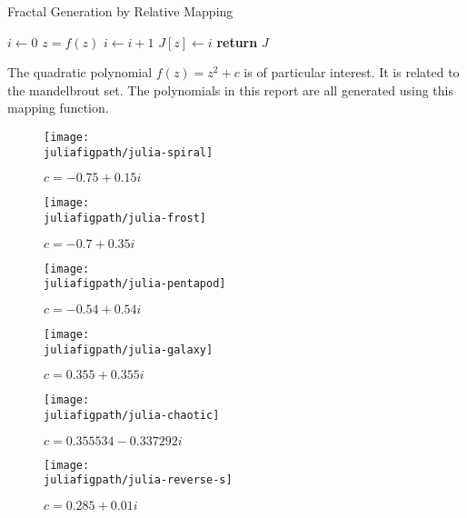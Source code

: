 \documentclass[12pt,a4paper]{article}
\newcommand{\juliafigpath}{../fig/julia}
\begin{document}
    \begin{algorithm}
        \caption{Fractal Generation by Relative Mapping}
        \label{alg:julia}
        \begin{algorithmic}[1]
                    \State $i \gets 0$
                        \State $z = f(z)$
                        \State $i \gets i + 1$
                    \EndWhile
                    \State $J[z] \gets i$
                \EndFor
                \State \textbf{return} $J$
            \EndFunction
        \end{algorithmic}
    \end{algorithm}
    The quadratic polynomial $f(z) = z^2 + c$ is of particular interest. It is related to the mandelbrout set.
    The polynomials in this report are all generated using this mapping function.
    \begin{figure}
        \centering
    \end{figure}
    \begin{figure}
        \centering
        \texttt{[image: \\juliafigpath/julia-spiral]}
        \caption{$c = -0.75 + 0.15i$}
    \end{figure}
    \newpage
    \thispagestyle{empty}
    \begin{figure}
        \centering
        \texttt{[image: \\juliafigpath/julia-frost]}
        \caption{$c = -0.7 + 0.35i$}
        \texttt{[image: \\juliafigpath/julia-pentapod]}
        \caption{$c = -0.54 + 0.54i$}
    \end{figure}
    \begin{figure}
        \centering
        \texttt{[image: \\juliafigpath/julia-galaxy]}
        \caption{$c = 0.355 + 0.355i$}
    \end{figure}
    \begin{figure}
        \centering
        \texttt{[image: \\juliafigpath/julia-chaotic]}
        \caption{$c = 0.355534 - 0.337292i$}
    \end{figure}
    \begin{figure}
        \centering
        \texttt{[image: \\juliafigpath/julia-reverse-s]}
        \caption{$c = 0.285 + 0.01i$}
    \end{figure}
\end{document}
